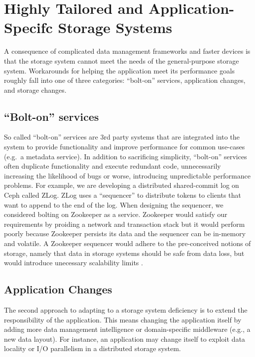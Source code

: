 \documentclass[10pt,twocolumn]{article}
\begin{document}
\section{Highly Tailored and Application-Specifc Storage
Systems}\label{highly-tailored-and-application-specifc-storage-systems}

\label{problem}

A consequence of complicated data management frameworks and faster
devices is that the storage system cannot meet the needs of the
general-purpose storage system. Workarounds for helping the application
meet its performance goals roughly fall into one of three categories:
``bolt-on'' services, application changes, and storage changes.

\subsection{\texorpdfstring{``Bolt-on''
services}{Bolt-on services}}\label{bolt-on-services}

So called ``bolt-on'' services are 3rd party systems that are integrated
into the system to provide functionality and improve performance for
common use-cases (e.g.~a metadata service). In addition to sacrificing
simplicity, ``bolt-on'' services often duplicate functionality and
execute redundant code, unnecessarily increasing the likelihood of bugs
or worse, introducing unpredictable performance problems. For example,
we are developing a distributed shared-commit log on Ceph called ZLog.
ZLog uses a ``sequencer'' to distribute tokens to clients that want to
append to the end of the log. When designing the sequencer, we
considered bolting on Zookeeper \cite{} as a service. Zookeeper would
satisfy our requirements by proiding a network and transaction stack but
it would perform poorly because Zookeeper persists its data and the
sequencer can be in-memory and volatile. A Zookeeper sequencer would
adhere to the pre-conceived notions of storage, namely that data in
storage systems should be safe from data loss, but would introduce
unecessary scalability limits \cite{Neha HDFS namenode example}.

\subsection{Application Changes}\label{application-changes}

The second approach to adapting to a storage system deficiency is to
extend the responsibility of the application. This means changing the
application itself by adding more data management intelligence or
domain-specific middleware (e.g., a new data layout). For instance, an
application may change itself to exploit data locality or I/O
parallelism in a distributed storage system.
\end{document}
